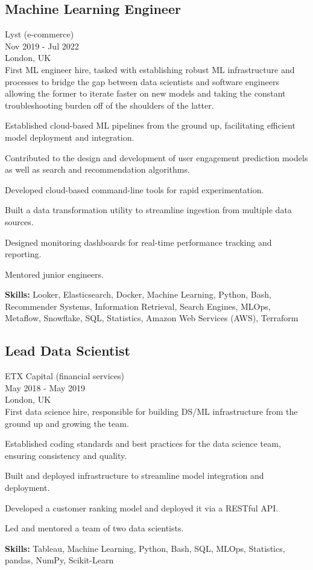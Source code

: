 \documentclass[a4paper,10pt]{article}
\begin{document}
\subsection*{Machine Learning Engineer}
Lyst (e-commerce) \\
Nov 2019 - Jul 2022 \\
London, UK \\
First ML engineer hire, tasked with establishing robust ML infrastructure and processes to bridge the gap between data scientists and software engineers allowing the former to iterate faster on new models and taking the constant troubleshooting burden off of the shoulders of the latter.
\begin{bulletlist}
    \item Established cloud-based ML pipelines from the ground up, facilitating efficient model deployment and integration.
    \item Contributed to the design and development of user engagement prediction models as well as search and recommendation algorithms.
    \item Developed cloud-based command-line tools for rapid experimentation.
    \item Built a data transformation utility to streamline ingestion from multiple data sources.
    \item Designed monitoring dashboards for real-time performance tracking and reporting.
    \item Mentored junior engineers.
\end{bulletlist}
\textbf{Skills:} Looker, Elasticsearch, Docker, Machine Learning, Python, Bash, Recommender Systems, Information Retrieval, Search Engines, MLOps, Metaflow, Snowflake, SQL, Statistics, Amazon Web Services (AWS), Terraform

\subsection*{Lead Data Scientist}
ETX Capital (financial services) \\
May 2018 - May 2019 \\
London, UK \\
First data science hire, responsible for building DS/ML infrastructure from the ground up and growing the team.
\begin{bulletlist}
    \item Established coding standards and best practices for the data science team, ensuring consistency and quality.
    \item Built and deployed infrastructure to streamline model integration and deployment.
    \item Developed a customer ranking model and deployed it via a RESTful API.
    \item Led and mentored a team of two data scientists.
\end{bulletlist}
\textbf{Skills: }Tableau, Machine Learning, Python, Bash, SQL, MLOps, Statistics, pandas, NumPy, Scikit-Learn
\end{document}
